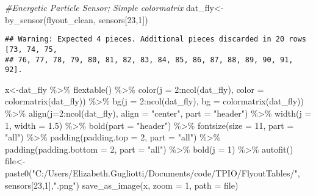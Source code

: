 \documentclass[
]{article}
\newenvironment{Shaded}{\begin{snugshade}}{\end{snugshade}}
\newcommand{\AttributeTok}[1]{\textcolor[rgb]{0.77,0.63,0.00}{#1}}
\newcommand{\CommentTok}[1]{\textcolor[rgb]{0.56,0.35,0.01}{\textit{#1}}}
\newcommand{\DecValTok}[1]{\textcolor[rgb]{0.00,0.00,0.81}{#1}}
\newcommand{\FloatTok}[1]{\textcolor[rgb]{0.00,0.00,0.81}{#1}}
\newcommand{\FunctionTok}[1]{\textcolor[rgb]{0.00,0.00,0.00}{#1}}
\newcommand{\NormalTok}[1]{#1}
\newcommand{\OtherTok}[1]{\textcolor[rgb]{0.56,0.35,0.01}{#1}}
\newcommand{\SpecialCharTok}[1]{\textcolor[rgb]{0.00,0.00,0.00}{#1}}
\newcommand{\StringTok}[1]{\textcolor[rgb]{0.31,0.60,0.02}{#1}}
\begin{document}
\begin{Shaded}
\begin{Highlighting}[]
\CommentTok{\#Energetic Particle Sensor; Simple colormatrix}
\NormalTok{dat\_fly}\OtherTok{\textless{}{-}}\FunctionTok{by\_sensor}\NormalTok{(flyout\_clean, sensors[}\DecValTok{23}\NormalTok{,}\DecValTok{1}\NormalTok{])}
\end{Highlighting}
\end{Shaded}

\begin{verbatim}
## Warning: Expected 4 pieces. Additional pieces discarded in 20 rows [73, 74, 75,
## 76, 77, 78, 79, 80, 81, 82, 83, 84, 85, 86, 87, 88, 89, 90, 91, 92].
\end{verbatim}

\begin{Shaded}
\begin{Highlighting}[]
\NormalTok{x}\OtherTok{\textless{}{-}}\NormalTok{dat\_fly }\SpecialCharTok{\%\textgreater{}\%}
  \FunctionTok{flextable}\NormalTok{() }\SpecialCharTok{\%\textgreater{}\%}
  \FunctionTok{color}\NormalTok{(}\AttributeTok{j =} \DecValTok{2}\SpecialCharTok{:}\FunctionTok{ncol}\NormalTok{(dat\_fly), }\AttributeTok{color =} \FunctionTok{colormatrix}\NormalTok{(dat\_fly)) }\SpecialCharTok{\%\textgreater{}\%}
  \FunctionTok{bg}\NormalTok{(}\AttributeTok{j =} \DecValTok{2}\SpecialCharTok{:}\FunctionTok{ncol}\NormalTok{(dat\_fly), }\AttributeTok{bg =} \FunctionTok{colormatrix}\NormalTok{(dat\_fly)) }\SpecialCharTok{\%\textgreater{}\%}
  \FunctionTok{align}\NormalTok{(}\AttributeTok{j=}\DecValTok{2}\SpecialCharTok{:}\FunctionTok{ncol}\NormalTok{(dat\_fly), }\AttributeTok{align =} \StringTok{"center"}\NormalTok{, }\AttributeTok{part =} \StringTok{"header"}\NormalTok{) }\SpecialCharTok{\%\textgreater{}\%}
  \FunctionTok{width}\NormalTok{(}\AttributeTok{j =} \DecValTok{1}\NormalTok{, }\AttributeTok{width =} \FloatTok{1.5}\NormalTok{) }\SpecialCharTok{\%\textgreater{}\%}
  \FunctionTok{bold}\NormalTok{(}\AttributeTok{part =} \StringTok{"header"}\NormalTok{) }\SpecialCharTok{\%\textgreater{}\%}
  \FunctionTok{fontsize}\NormalTok{(}\AttributeTok{size =} \DecValTok{11}\NormalTok{, }\AttributeTok{part =} \StringTok{"all"}\NormalTok{) }\SpecialCharTok{\%\textgreater{}\%}
  \FunctionTok{padding}\NormalTok{(}\AttributeTok{padding.top =} \DecValTok{2}\NormalTok{, }\AttributeTok{part =} \StringTok{"all"}\NormalTok{) }\SpecialCharTok{\%\textgreater{}\%}
  \FunctionTok{padding}\NormalTok{(}\AttributeTok{padding.bottom =} \DecValTok{2}\NormalTok{, }\AttributeTok{part =} \StringTok{"all"}\NormalTok{) }\SpecialCharTok{\%\textgreater{}\%}
  \FunctionTok{bold}\NormalTok{(}\AttributeTok{j =} \DecValTok{1}\NormalTok{) }\SpecialCharTok{\%\textgreater{}\%} \FunctionTok{autofit}\NormalTok{()}
\NormalTok{file}\OtherTok{\textless{}{-}}\FunctionTok{paste0}\NormalTok{(}\StringTok{"C:/Users/Elizabeth.Gugliotti/Documents/code/TPIO/FlyoutTables/"}\NormalTok{, sensors[}\DecValTok{23}\NormalTok{,}\DecValTok{1}\NormalTok{],}\StringTok{".png"}\NormalTok{)}
\FunctionTok{save\_as\_image}\NormalTok{(x, }\AttributeTok{zoom =} \DecValTok{1}\NormalTok{, }\AttributeTok{path =}\NormalTok{ file)}
\end{Highlighting}
\end{Shaded}
\end{document}
